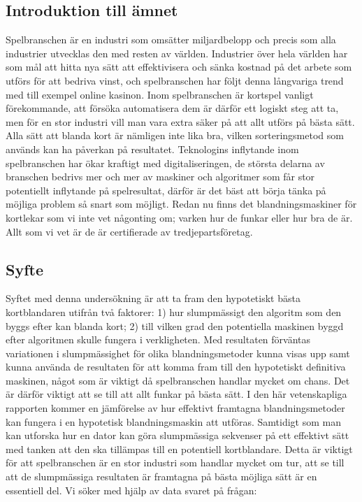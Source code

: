 \documentclass[swedish,a4paper]{article}
\begin{document}
\subsection{Introduktion till ämnet}
Spelbranschen är en industri som omsätter miljardbelopp och precis som alla
industrier utvecklas den med resten av världen. Industrier över hela världen har
som mål att hitta nya sätt att effektivisera och sänka kostnad på det arbete som
utförs för att bedriva vinst, och spelbranschen har följt denna långvariga trend
med till exempel online kasinon. Inom spelbranschen är kortspel vanligt
förekommande, att försöka automatisera dem är därför ett logiskt steg att ta, men för
en stor industri vill man vara extra säker på att allt utförs på bästa sätt.
Alla sätt att blanda kort är nämligen inte lika bra, vilken sorteringsmetod som
används kan ha påverkan på resultatet. Teknologins inflytande inom spelbranschen har
ökar kraftigt med digitaliseringen, de största delarna av branschen bedrivs mer och mer av maskiner
och algoritmer som får stor potentiellt inflytande på spelresultat, därför är
det bäst att börja tänka på möjliga problem så snart som möjligt. Redan nu finns
det blandningsmaskiner för kortlekar som vi inte vet någonting om; varken hur de
funkar eller hur bra de är. Allt som vi vet är de är certifierade av
tredjepartsföretag.

\subsection{Syfte}
\label{sec:purpose}
Syftet med denna undersökning är att ta fram den hypotetiskt bästa kortblandaren
utifrån två faktorer: 1) hur slumpmässigt den algoritm som den byggs efter kan
blanda kort; 2) till vilken grad den potentiella maskinen byggd efter algoritmen
skulle fungera i verkligheten. Med resultaten förväntas variationen i
slumpmässighet för olika blandningsmetoder kunna visas upp samt kunna använda de
resultaten för att komma fram till den hypotetiskt definitiva maskinen, något
som är viktigt då spelbranschen handlar mycket om chans. Det är därför viktigt
att se till att allt funkar på bästa sätt. I den här vetenskapliga rapporten
kommer en jämförelse av hur effektivt framtagna blandningsmetoder kan fungera i
en hypotetisk blandningsmaskin att utföras. Samtidigt som man kan utforska hur
en dator kan göra slumpmässiga sekvenser på ett effektivt sätt med tanken att
den ska tillämpas till en potentiell kortblandare. Detta är viktigt för att
spelbranschen är en stor industri som handlar mycket om tur, att se till att de
slumpmässiga resultaten är framtagna på bästa möjliga sätt är en essentiell del.
Vi söker med hjälp av data svaret på frågan:
\end{document}
